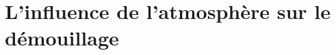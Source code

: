 \documentclass[12pt,french]{report}
\begin{document}
\chapter{L'influence de l'atmosphère sur le démouillage}


%



%
%
\end{document}
